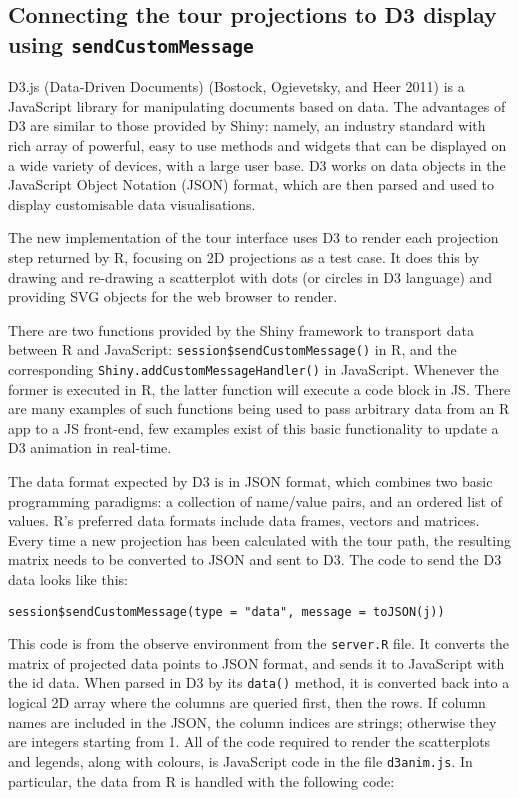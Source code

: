 \subsection{Connecting the tour projections to D3 display using
\texttt{sendCustomMessage}}\label{connecting-the-tour-projections-to-d3-display-using-sendcustommessage}

D3.js (Data-Driven Documents) (Bostock, Ogievetsky, and Heer 2011) is a
JavaScript library for manipulating documents based on data. The
advantages of D3 are similar to those provided by Shiny: namely, an
industry standard with rich array of powerful, easy to use methods and
widgets that can be displayed on a wide variety of devices, with a large
user base. D3 works on data objects in the JavaScript Object Notation
(JSON) format, which are then parsed and used to display customisable
data visualisations.

The new implementation of the tour interface uses D3 to render each
projection step returned by R, focusing on 2D projections as a test
case. It does this by drawing and re-drawing a scatterplot with dots (or
circles in D3 language) and providing SVG objects for the web browser to
render.

There are two functions provided by the Shiny framework to transport
data between R and JavaScript: \texttt{session\$sendCustomMessage()} in
R, and the corresponding \texttt{Shiny.addCustomMessageHandler()} in
JavaScript. Whenever the former is executed in R, the latter function
will execute a code block in JS. There are many examples of such
functions being used to pass arbitrary data from an R app to a JS
front-end, few examples exist of this basic functionality to update a D3
animation in real-time.

The data format expected by D3 is in JSON format, which combines two
basic programming paradigms: a collection of name/value pairs, and an
ordered list of values. R's preferred data formats include data frames,
vectors and matrices. Every time a new projection has been calculated
with the tour path, the resulting matrix needs to be converted to JSON
and sent to D3. The code to send the D3 data looks like this:

\begin{verbatim}
session$sendCustomMessage(type = "data", message = toJSON(j))
\end{verbatim}

This code is from the observe environment from the \texttt{server.R}
file. It converts the matrix of projected data points to JSON format,
and sends it to JavaScript with the id data. When parsed in D3 by its
\texttt{data()} method, it is converted back into a logical 2D array
where the columns are queried first, then the rows. If column names are
included in the JSON, the column indices are strings; otherwise they are
integers starting from 1. All of the code required to render the
scatterplots and legends, along with colours, is JavaScript code in the
file \texttt{d3anim.js}. In particular, the data from R is handled with
the following code:

